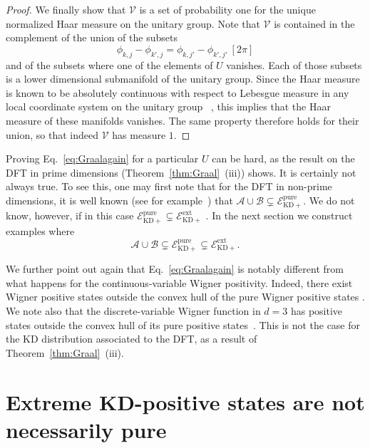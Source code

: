 \documentclass[a4paper, notitlepage, 11pt]{article}
\numberwithin{equation}{section}
\newcommand{\red}[1]{\textcolor{red}{#1}}
\newcommand{\mcl}[1]{\mathcal{#1}}
\newcommand{\Acal}{{\mathcal A}}
\newcommand{\Bcal}{{\mathcal B}}
\newcommand{\EcalKDCpu}{{\mathcal E}_{\mathrm{KD+}}^{\mathrm{pure}}}
\newcommand{\EcalKDCext}{{\mathcal E}_{\mathrm{KD+}}^{\mathrm{ext}}}
\begin{document}
\begin{proof}
We finally show  that $\mcl{V}$ is a set of probability one for the unique normalized Haar measure on the unitary group.  Note that $\mcl{V}$ is contained in the complement of the union of the subsets  
$$
\phi_{k,j} -  \phi_{k',j} =  \phi_{k,j'} -  \phi_{k',j'} \ [2\pi]
$$
and of the subsets where one of the elements of $U$ vanishes.  Each of those subsets is a lower dimensional submanifold of the unitary group.  Since the Haar measure is known to be absolutely continuous with respect to Lebesgue measure in any local coordinate system on the unitary group~\cite{folland2016}%
, this implies {that} the Haar measure of these manifolds vanishes. The same property therefore holds for their union, so that indeed $\mcl{V}$ has measure $1$. 



    
\end{proof}

Proving Eq.~\eqref{eq:Graalagain} for a particular $U$ can be hard, as the result on the DFT in prime dimensions (Theorem~\ref{thm:Graal}~(iii)) shows. It is certainly not always true. To see this, one may first note that for the DFT in non-prime dimensions, it is well known (see for example~\cite{ debievre2023a,Xu22}) that
$
\Acal\cup\Bcal\subsetneq\EcalKDCpu.
$
We do not know, however, if in {this} case 
$
\EcalKDCpu\subsetneq \EcalKDCext
$
. In the next section we construct examples where
$$
\Acal\cup\Bcal\subsetneq \EcalKDCpu\subsetneq \EcalKDCext.
$$

We further point out again that Eq.~\eqref{eq:Graalagain} is notably different from what happens for the continuous-variable Wigner positivity. Indeed, there  exist Wigner positive states outside the convex hull of the pure Wigner positive states \cite{hudson1974, takagizhuang2018}. We note also that the discrete-variable Wigner function in $d=3$ has positive states outside the convex hull of its pure positive states~\cite{gross2006}. This is not the case for the KD distribution associated to the DFT, as a result of Theorem~\ref{thm:Graal}~(iii). 



\section{Extreme KD-positive states are not necessarily pure}\label{s:eurekanew}
\end{document}

